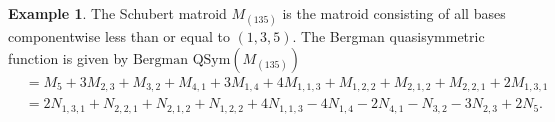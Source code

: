 \documentclass[12pt,reqno]{amsart}
\numberwithin{definition}{section}
\theoremstyle{definition}
\newtheorem{example}[definition]{Example}
\begin{document}

\begin{example}




The Schubert matroid $M_{(135)}$ is the matroid consisting of 
all bases componentwise less than or equal to $(1,3,5)$.  The Bergman quasisymmetric function is given by $ \textrm{Bergman QSym}(M_{(135)})$ 
\begin{align*}
&  =  M_5 + 3M_{2,3} + M_{3,2} + M_{4,1} + 3M_{1,4}  + 4M_{1,1,3} + M_{1,2,2} + M_{2,1,2} + M_{2,2,1} + 2M_{1,3,1}\\
&  =  2N_{1,3,1} + N_{2,2,1} + N_{2,1,2} + N_{1,2,2} + 4N_{1,1,3}  - 4 N_{1,4} - 2N_{4,1} - N_{3,2} - 3N_{2,3} + 2N_5.
\end{align*}

\end{example}



\end{document}
